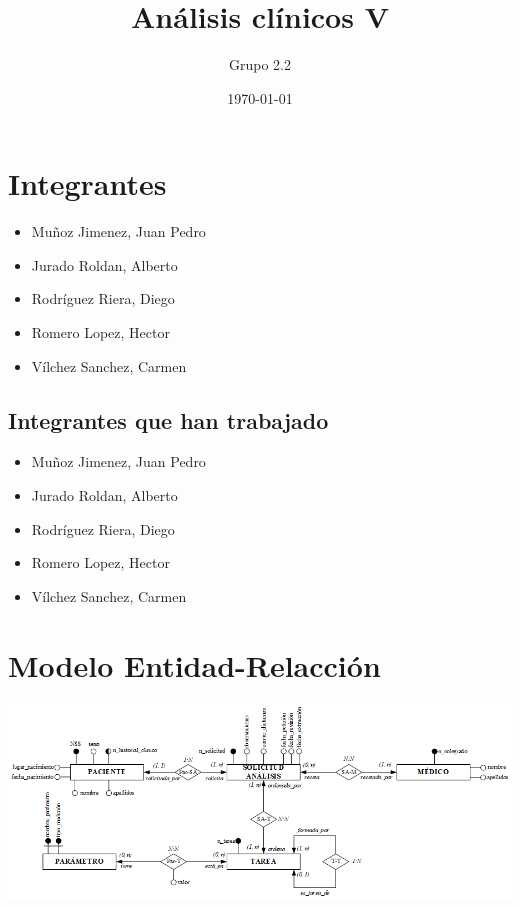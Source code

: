 \documentclass[a4paper,10pt]{article}
\title{Análisis clínicos V}
\author{Grupo 2.2}
\date{\today}
\begin{document}
\maketitle
\pagebreak


\section{Integrantes}
\begin{itemize}
  \item Muñoz Jimenez, Juan Pedro
  \item Jurado Roldan, Alberto
	\item Rodríguez Riera, Diego
  \item Romero Lopez, Hector
  \item Vílchez Sanchez, Carmen
\end{itemize}

\subsection{Integrantes que han trabajado}
\begin{itemize}
  \item Muñoz Jimenez, Juan Pedro
  \item Jurado Roldan, Alberto
	\item Rodríguez Riera, Diego
  \item Romero Lopez, Hector
  \item Vílchez Sanchez, Carmen
\end{itemize}

\pagebreak
\section{Modelo Entidad-Relacción}
\begin{centering}
\includegraphics[scale=.63, angle=90]{img/er.png}\\
\end{centering}
\end{document}
